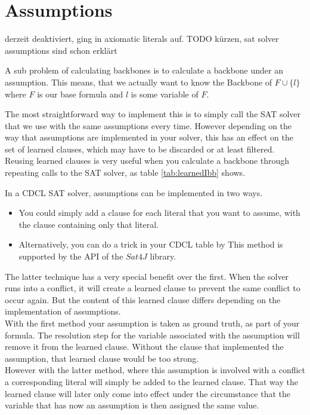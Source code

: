 \section{Assumptions}

derzeit deaktiviert, ging in axiomatic literals auf.
TODO kürzen, sat solver assumptions sind schon erklärt


A sub problem of calculating backbones is to calculate a backbone under an assumption. This means, that we actually want to know the Backbone of $F \cup\{l\}$ where $F$ is our base formula and $l$ is some variable of $F$.

The most straightforward way to implement this is to simply call the SAT solver that we use with the same assumptions every time. However depending on the way that assumptions are implemented in your solver, this has an effect on the set of learned clauses, which may have to be discarded or at least filtered. Reusing learned clauses is very useful when you calculate a backbone through repeating calls to the SAT solver, as table \ref{tab:learnedIbb} shows.

In a CDCL SAT solver, assumptions can be implemented in two ways. 
\begin{itemize}
	\setlength\itemsep{0pt}
	\item You could simply add a clause for each literal that you want to assume, with the clause containing only that literal.
	\item Alternatively, you can do a trick in your CDCL table by  This method is supported by the API of the $Sat4J$ library.
\end{itemize}

The latter technique has a very special benefit over the first. When the solver runs into a conflict, it will create a learned clause to prevent the same conflict to occur again. But the content of this learned clause differs depending on the implementation of assumptions.\\
With the first method your assumption is taken as ground truth, as part of your formula. The resolution step for the variable associated with the assumption will remove it from the learned clause. Without the clause that implemented the assumption, that learned clause would be too strong.\\
However with the latter method, where this assumption is involved with a conflict a corresponding literal will simply be added to the learned clause. That way the learned clause will later only come into effect under the circumstance that the variable that has now an assumption is then assigned the same value.

